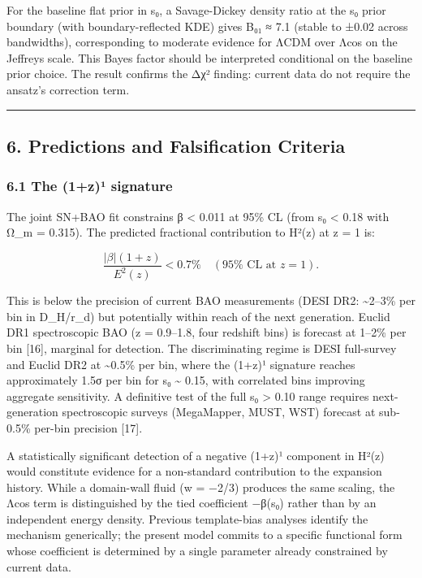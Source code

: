 For the baseline flat prior in s₀, a Savage-Dickey density ratio at the
s₀ prior boundary (with boundary-reflected KDE) gives B₀₁ ≈ 7.1 (stable
to ±0.02 across bandwidths), corresponding to moderate evidence for ΛCDM
over Λcos on the Jeffreys scale. This Bayes factor should be interpreted
conditional on the baseline prior choice. The result confirms the Δχ²
finding: current data do not require the ansatz's correction term.

\begin{center}\rule{0.5\linewidth}{0.5pt}\end{center}

\subsection{6. Predictions and Falsification
Criteria}\label{predictions-and-falsification-criteria}

\subsubsection{6.1 The (1+z)¹ signature}\label{the-1zuxb9-signature}

The joint SN+BAO fit constrains \textbar β\textbar{} \textless{} 0.011
at 95\% CL (from s₀ \textless{} 0.18 with Ω\_m = 0.315). The predicted
fractional contribution to H²(z) at z = 1 is:

\[\frac{|\beta|(1+z)}{E^2(z)} < 0.7\% \quad (95\% \text{ CL at } z = 1).\]

This is below the precision of current BAO measurements (DESI DR2:
\textasciitilde2--3\% per bin in D\_H/r\_d) but potentially within reach
of the next generation. Euclid DR1 spectroscopic BAO (z = 0.9--1.8, four
redshift bins) is forecast at 1--2\% per bin {[}16{]}, marginal for
detection. The discriminating regime is DESI full-survey and Euclid DR2
at \textasciitilde0.5\% per bin, where the (1+z)¹ signature reaches
approximately 1.5σ per bin for s₀ \textasciitilde{} 0.15, with
correlated bins improving aggregate sensitivity. A definitive test of
the full s₀ \textgreater{} 0.10 range requires next-generation
spectroscopic surveys (MegaMapper, MUST, WST) forecast at sub-0.5\%
per-bin precision {[}17{]}.

A statistically significant detection of a negative (1+z)¹ component in
H²(z) would constitute evidence for a non-standard contribution to the
expansion history. While a domain-wall fluid (w = −2/3) produces the
same scaling, the Λcos term is distinguished by the tied coefficient
−β(s₀) rather than by an independent energy density. Previous
template-bias analyses identify the mechanism generically; the present
model commits to a specific functional form whose coefficient is
determined by a single parameter already constrained by current data.

